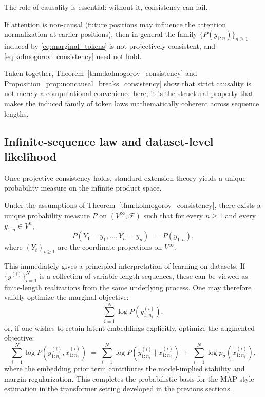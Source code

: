 \documentclass[11pt]{article}
\begin{document}
The role of causality is essential: without it, consistency can fail.

\begin{proposition}
\label{prop:noncausal_breaks_consistency}
If attention is non-causal (future positions may influence the attention normalization at earlier positions), then in general the family $\{P(y_{1:n})\}_{n\ge 1}$ induced by \eqref{eq:marginal_tokens} is not projectively consistent, and \eqref{eq:kolmogorov_consistency} need not hold.
\end{proposition}

Taken together, Theorem~\ref{thm:kolmogorov_consistency} and Proposition~\ref{prop:noncausal_breaks_consistency} show that strict causality is not merely a computational convenience here; it is the structural property that makes the induced family of token laws mathematically coherent across sequence lengths.

\subsection{Infinite-sequence law and dataset-level likelihood}
\label{subsec:infinite_law_and_datasets}

Once projective consistency holds, standard extension theory yields a unique probability measure on the infinite product space.

\begin{theorem}
\label{thm:kolmogorov_extension}
Under the assumptions of Theorem~\ref{thm:kolmogorov_consistency}, there exists a unique probability measure $P$ on $(V^\infty,\mathcal F)$ such that for every $n\ge 1$ and every $y_{1:n}\in V^n$,
\begin{equation}
P(Y_1=y_1,\dots,Y_n=y_n) \;=\; P(y_{1:n}),
\end{equation}
where $(Y_t)_{t\ge 1}$ are the coordinate projections on $V^\infty$.
\end{theorem}

This immediately gives a principled interpretation of learning on datasets. If $\{y^{(i)}\}_{i=1}^N$ is a collection of variable-length sequences, these can be viewed as finite-length realizations from the same underlying process. One may therefore validly optimize the marginal objective:
\[
\sum_{i=1}^N \log P(y^{(i)}_{1:n_i}),
\]
or, if one wishes to retain latent embeddings explicitly, optimize the augmented objective:
\begin{equation}
\sum_{i=1}^N \log P(y^{(i)}_{1:n_i}, x^{(i)}_{1:n_i})
\;=\;
\sum_{i=1}^N \log P(y^{(i)}_{1:n_i}\mid x^{(i)}_{1:n_i})
\;+\;
\sum_{i=1}^N \log p_\sigma(x^{(i)}_{1:n_i}),
\label{eq:augmented_dataset_objective}
\end{equation}
where the embedding prior term contributes the model-implied stability and margin regularization. This completes the probabilistic basis for the MAP-style estimation in the transformer setting developed in the previous sections.
\end{document}
